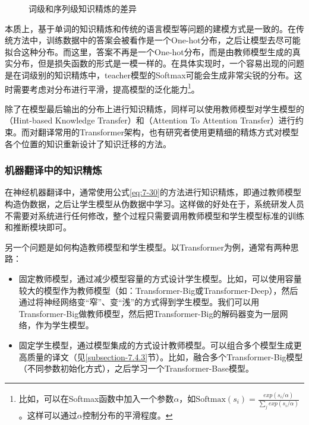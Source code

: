 \begin{figure}[htp]
\centering

\caption{词级和序列级知识精炼的差异}
\label{fig:7-41}
\end{figure}

\parinterval 本质上，基于单词的知识精炼和传统的语言模型等问题的建模方式是一致的。在传统方法中，训练数据中的答案会被看作是一个One-hot分布，之后让模型去尽可能拟合这种分布。而这里，答案不再是一个One-hot分布，而是由教师模型生成的真实分布，但是损失函数的形式是一模一样的。在具体实现时，一个容易出现的问题是在词级别的知识精炼中，teacher模型的Softmax可能会生成非常尖锐的分布。这时需要考虑对分布进行平滑，提高模型的泛化能力\footnote[16]{比如，可以在Softmax函数中加入一个参数$\alpha$，如$\textrm{Softmax}(s_i)=\frac{exp(s_i/\alpha)}{\sum_j exp(s_i/\alpha)}$。这样可以通过$\alpha$控制分布的平滑程度。
}。

\parinterval 除了在模型最后输出的分布上进行知识精炼，同样可以使用教师模型对学生模型的{\small{}}（Hint-based Knowledge Transfer）和{\small{}}（Attention To Attention Transfer）进行约束。而对翻译常用的Transformer架构，也有研究者使用更精细的精炼方式对模型各个位置的知识重新设计了知识迁移的方法\cite{DBLP:journals/corr/abs-1909-10351}。


\subsubsection{机器翻译中的知识精炼}

\parinterval 在神经机器翻译中，通常使用公式\ref{eq:7-30}的方法进行知识精炼，即通过教师模型构造伪数据，之后让学生模型从伪数据中学习。这样做的好处在于，系统研发人员不需要对系统进行任何修改，整个过程只需要调用教师模型和学生模型标准的训练和推断模块即可。

\parinterval 另一个问题是如何构造教师模型和学生模型。以Transformer为例，通常有两种思路：

\begin{itemize}
\vspace{0.5em}
\item 固定教师模型，通过减少模型容量的方式设计学生模型。比如，可以使用容量较大的模型作为教师模型（如：Transformer-Big或Transformer-Deep），然后通过将神经网络变``窄''、变``浅''的方式得到学生模型。我们可以用Transformer-Big做教师模型，然后把Transformer-Big的解码器变为一层网络，作为学生模型。
\vspace{0.5em}
\item 固定学生模型，通过模型集成的方式设计教师模型。可以组合多个模型生成更高质量的译文（见\ref{subsection-7.4.3}节）。比如，融合多个Transformer-Big模型（不同参数初始化方式），之后学习一个Transformer-Base模型。
\vspace{0.5em}
\end{itemize}

